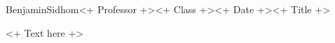\documentclass[12pt,letterpaper]{article}
\begin{document}
\begin{mla}{Benjamin}{Sidhom}{<+ Professor +>}{<+ Class +>}{<+ Date +>}{<+ Title +>}

  <+ Text here +>

\begin{workscited}

\end{workscited}

\end{mla}
\end{document}
